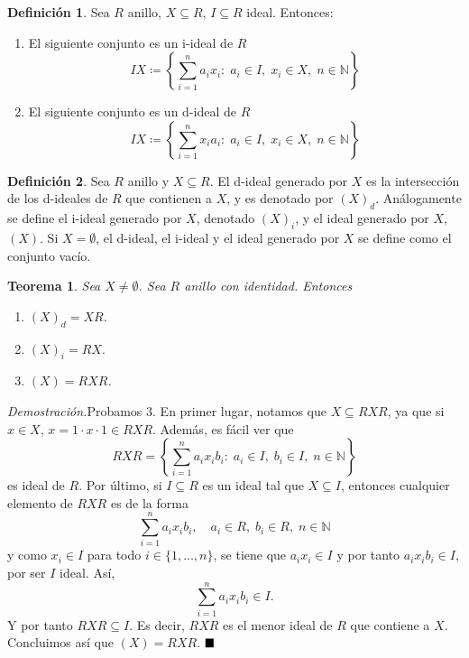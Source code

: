 \documentclass[11pt]{book}
\def\N{\mathbb{N}}
\def\qed{\hfill\blacksquare}
\newtheorem{theorem}{Teorema}[section]
\theoremstyle{definition}
\newtheorem{definition}{Definición}[section]
\begin{document}
\begin{definition}
    Sea $R$ anillo, $X\subseteq R$, $I\subseteq R$ ideal. Entonces:\begin{enumerate}
        \item El siguiente conjunto es un i-ideal de $R$\[
        IX\coloneq \left\{\sum_{i=1}^n a_ix_i:\; a_i\in I,\; x_i\in X,\; n\in \N\right\}
        \]
        \item El siguiente conjunto es un d-ideal de $R$\[
            IX\coloneq \left\{\sum_{i=1}^n x_ia_i :\; a_i\in I,\; x_i\in X,\; n\in \N\right\}
        \]
    \end{enumerate}
\end{definition}
\begin{definition}
    Sea $R$ anillo y $X\subseteq R$. El d-ideal generado por $X$ es la intersección de los d-ideales de $R$ que contienen a $X$, y es denotado por $(X)_d$. Análogamente se define el i-ideal generado por $X$, denotado $(X)_i$, y el ideal generado por $X$, $(X)$. Si $X=\emptyset$, el d-ideal, el i-ideal y el ideal generado por $X$ se define como el conjunto vacío.
\end{definition}
\begin{theorem}
    Sea $X\neq \emptyset$. Sea $R$ anillo con identidad. Entonces\begin{enumerate}
        \item $(X)_d=XR.$
        \item $(X)_i=RX.$
        \item $(X)=RXR$.
    \end{enumerate}
\end{theorem}
\noindent\textit{Demostración.}Probamos 3. En primer lugar, notamos que $X\subseteq RXR$, ya que si $x\in X$, $x=1\cdot x\cdot 1\in RXR$. Además, es fácil ver que\[
RXR=\left\{\sum_{i=1}^n a_ix_ib_i:\; a_i\in I,\; b_i\in I,\; n\in \N\right\}
\]es ideal de $R$. Por último, si $I\subseteq R$ es un ideal tal que $X\subseteq I$, entonces cualquier elemento de $RXR$ es de la forma\[
    \sum_{i=1}^n a_ix_ib_i,\quad a_i\in R,\; b_i\in R,\; n\in \N
\]y como $x_i\in I$ para todo $i\in\{1,\dots,n\}$, se tiene que $a_ix_i\in I$ y por tanto $a_ix_ib_i\in I$, por ser $I$ ideal. Así,\[
    \sum_{i=1}^n a_ix_ib_i\in I.
\]Y por tanto $RXR\subseteq I$. Es decir, $RXR$ es el menor ideal de $R$ que contiene a $X$. Concluimos así que $(X)=RXR$. $\qed$
\end{document}
